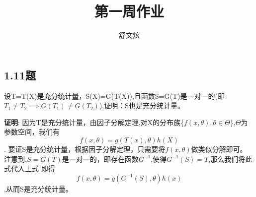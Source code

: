 \documentclass[
  hyperref]{ctexart}
\title{第一周作业}
\author{舒文炫}
\date{}
\begin{document}
\maketitle

{
\setcounter{tocdepth}{2}
\tableofcontents
}
\hypertarget{ux9898}{%
\subsection{1.11题}\label{ux9898}}

设T=T(X)是充分统计量，S(X)=G(T(X)),且函数S=G(T)是一对一的(即\(T_1 \neq T_2 \implies G(T_1) \neq G(T_2)\)),证明：S也是充分统计量。

\textbf{证明}:
因为T是充分统计量，由因子分解定理,对X的分布族\{\(f(x,\theta),\theta \in \Theta\)\},\(\Theta\)为参数空间，我们有\[f(x,\theta)=g(T(x),\theta)h(X)\].
要证S是充分统计量，根据因子分解定理，只需要将\(f(x,\theta)\)做类似分解即可。
注意到,\(S=G(T)\)是一对一的，即存在函数\(G^{-1}\),使得\(G^{-1}(S)=T\),那么我们将此式代入上式
即得\[f(x,\theta)=g(G^{-1}(S),\theta)h(x)\],从而S是充分统计量。
\end{document}

